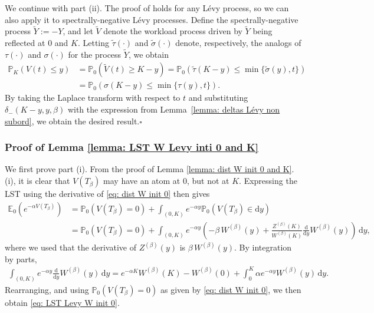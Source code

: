 \documentclass[reqno,12pt]{amsart}
\begin{document}
{We continue with part (ii).  The proof of \cite[Proposition XIV.3.7]{ASM2} holds for any L\'evy process, so we can also apply it to spectrally-negative L\'evy processes. Define
the spectrally-negative process $\tilde{Y} := -Y$, and let $\tilde{V}$ denote the workload process driven by $\tilde{Y}$ being reflected at $0$ and $K$. Letting $\tilde{\tau}(\cdot)$ and $\tilde{\sigma}(\cdot)$ denote, respectively, the analogs of $\tau(\cdot)$ and $\sigma(\cdot)$ for the process $\tilde{Y}$, we obtain
\begin{align*}
    \mathbb{P}_K(V(t) \leqslant y) &= \mathbb{P}_0\left(\tilde{V}(t) \geqslant K-y\right) = \mathbb{P}_0\left(\tilde{\tau}(K-y)\leqslant\min\{\tilde\sigma(y), t\}\right) \\&= \mathbb{P}_0\left(\sigma(K-y) \leqslant \min\{\tau(y), t\}\right).
\end{align*} 
By taking the Laplace transform with respect to $t$ and substituting $\delta_-(K-y,y,\beta)$ with the expression from Lemma~\ref{lemma: deltas Lévy non subord}, we obtain the desired result.\hfill$\square$

\subsubsection*{Proof of Lemma \ref{lemma: LST W Levy inti 0 and K}}
We first prove part (i). From the proof of Lemma \ref{lemma: dist W init 0 and K}.(i), it is clear that $V(T_\beta)$ may have an atom at $0$, but not at $K$. Expressing the LST using the derivative of \eqref{eq: dist W init 0} then gives \begin{align*}
    \mathbb{E}_0\left(e^{-\alpha V(T_\beta)}\right) &= \mathbb{P}_0\left(V(T_\beta) = 0\right) + \int_{(0,K)}e^{-\alpha y}\mathbb{P}_0\left(V(T_\beta)\in\mathrm{d}y\right) \\
    &= \mathbb{P}_0\left(V(T_\beta) = 0\right) + \int_{(0,K)}e^{-\alpha y}\left(-\beta\, W^{(\beta)}(y) + \frac{Z^{(\beta)}(K)}{W^{(\beta)}(K)}\frac{\mathrm{d}}{\mathrm{d}y}W^{(\beta)}(y)\right)\,\mathrm{d}y,
\end{align*}
where we used that the derivative of $Z^{(\beta)}(y)$ is $\beta \,W^{(\beta)}(y)$. By integration by parts,
\begin{align*}
    \int_{(0,K)}e^{-\alpha y} \frac{\mathrm{d}}{\mathrm{d}y}W^{(\beta)}(y)\,\mathrm{d}y = e^{-\alpha K}W^{(\beta)}(K) - W^{(\beta)}(0) + \int_0^K \alpha e^{-\alpha y}W^{(\beta)}(y)\,\mathrm{d}y.
\end{align*}
Rearranging, and using $\mathbb{P}_0\left(V(T_\beta) = 0\right)$ as given by \eqref{eq: dist W init 0}, we then obtain \eqref{eq: LST Levy W init 0}.

}
\end{document}
